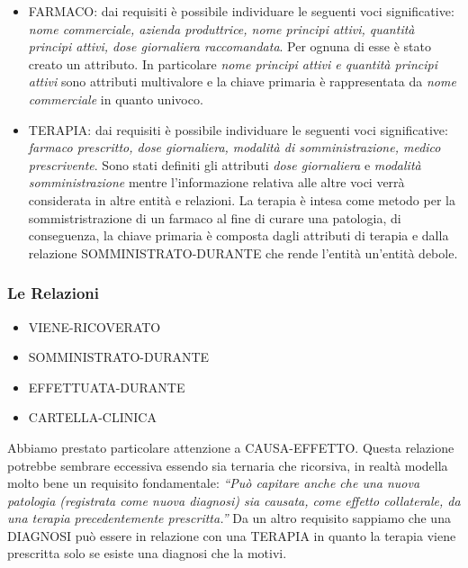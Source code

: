\documentclass{article}
\begin{document}
\begin{itemize}
        \item FARMACO: dai requisiti è possibile individuare le seguenti voci
              significative: \textit{nome commerciale, azienda produttrice, 
              nome principi attivi, quantità principi attivi, dose giornaliera
              raccomandata}. Per ognuna di esse è stato creato un attributo. In
              particolare \textit{nome principi attivi e quantità principi 
              attivi} sono attributi multivalore e la chiave primaria è 
              rappresentata da \textit{nome commerciale} in quanto univoco.

        \item TERAPIA: dai requisiti è possibile individuare le seguenti voci
              significative: \textit{farmaco prescritto, dose giornaliera, 
              modalità di somministrazione, medico prescrivente}. Sono stati
              definiti gli attributi \textit{dose giornaliera} e 
              \textit{modalità somministrazione} mentre l'informazione relativa
              alle altre voci verrà considerata in altre entità e relazioni.
              La terapia è intesa come metodo per la sommistristrazione di un
              farmaco al fine di curare una patologia, di conseguenza, la 
              chiave primaria è composta dagli attributi di terapia e dalla
              relazione SOMMINISTRATO-DURANTE che rende l'entità un'entità
              debole.
    \end{itemize}

\subsubsection{Le Relazioni}
\begin{itemize}
  \item VIENE-RICOVERATO
  \item SOMMINISTRATO-DURANTE
  \item EFFETTUATA-DURANTE
  \item CARTELLA-CLINICA
\end{itemize}
Abbiamo prestato particolare attenzione a CAUSA-EFFETTO.
Questa relazione potrebbe sembrare eccessiva essendo sia ternaria che ricorsiva,
in realtà modella molto bene un requisito fondamentale: \textit{``Può capitare
anche che una nuova patologia (registrata come nuova diagnosi) sia causata, come
effetto collaterale, da una terapia precedentemente prescritta.''} Da un altro
requisito sappiamo che una DIAGNOSI può essere in relazione con una TERAPIA in
quanto la terapia viene prescritta solo se esiste una diagnosi che la motivi.
\end{document}
